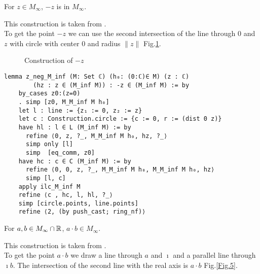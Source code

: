 \begin{lemma}
    \label{lem:construction_neg}
    \leanok
    For $z \in M_{\infty}$,  $-z$ is in $M_{\infty}$.
\end{lemma}
This construction is taken from \cite{JAN_SCHROEER:2023}.\\
To get the point $-z$ we can use the second intersection of the line through $0$ and $z$ with circle with center $0$ and radius $\|z\|$ Fig.\ref{Fig.1}.

\begin{figure}[h!]
    \centering
    \caption{Construction of $-z$}
    \label{Fig.1}
\end{figure}

\begin{lstlisting}
lemma z_neg_M_inf (M: Set ℂ) (h₀: (0:ℂ)∈ M) (z : ℂ) 
        (hz : z ∈ (M_inf M)) : -z ∈ (M_inf M) := by
    by_cases z0:(z=0)
    . simp [z0, M_M_inf M h₀]
    let l : line := {z₁ := 0, z₂ := z}
    let c : Construction.circle := {c := 0, r := (dist 0 z)}
    have hl : l ∈ L (M_inf M) := by
      refine ⟨0, z, ?_, M_M_inf M h₀, hz, ?_⟩
      simp only [l]
      simp  [eq_comm, z0]
    have hc : c ∈ C (M_inf M) := by
      refine ⟨0, 0, z, ?_, M_M_inf M h₀, M_M_inf M h₀, hz⟩
      simp [l, c]
    apply ilc_M_inf M
    refine ⟨c , hc, l, hl, ?_⟩
    simp [circle.points, line.points]
    refine ⟨2, (by push_cast; ring_nf)⟩
\end{lstlisting}

\begin{lemma}
    \label{lem:construction_mul}
    \leanok
    For $a, b \in M_{\infty}\cap\mathbb{R}$, $a \cdot b \in M_{\infty}$.
\end{lemma}
This construction is taken from \cite{cox2012galois}.\\
To get the point $a\cdot b$ we draw a line through $a$ and $\imath$ and a parallel line through $\imath b$. The intersection of the second line with the real axis is $a\cdot b$ Fig.\ref{Fig.5}.


